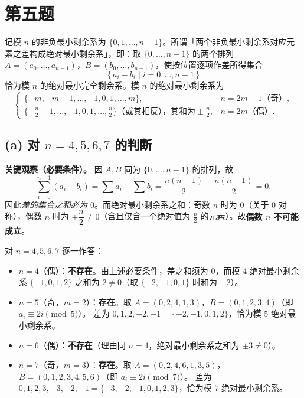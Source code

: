 \documentclass{article}
\begin{document}
\section{第五题}

记模 $n$ 的非负最小剩余系为 $\{0,1,\dots,n-1\}$。所谓「两个非负最小剩余系对应元素之差构成绝对最小剩余系」，即：取 $\{0,\dots,n-1\}$ 的两个排列 $A=(a_0,\dots,a_{n-1})$，$B=(b_0,\dots,b_{n-1})$，使按位置逐项作差所得集合
\[
  \{\,a_i-b_i\mid i=0,\dots,n-1\,\}
\]
恰为模 $n$ 的绝对最小完全剩余系。模 $n$ 的绝对最小剩余系为
\[
  \begin{cases}
    \{-m,-m+1,\dots,-1,0,1,\dots,m\}, & n=2m+1\text{（奇）},\\[2pt]
    \{-\tfrac n2+1,\dots,-1,0,1,\dots,\tfrac n2\}\text{（或其相反），其和为}\pm\tfrac n2, & n=2m\text{（偶）}.
  \end{cases}
\]

\subsection*{(a) 对 $n=4,5,6,7$ 的判断}

\begin{solution}
\textbf{关键观察（必要条件）。} 因 $A,B$ 同为 $\{0,\dots,n-1\}$ 的排列，故
\[
  \sum_{i=0}^{n-1}(a_i-b_i)=\sum a_i-\sum b_i=\frac{n(n-1)}2-\frac{n(n-1)}2=0.
\]
因此\emph{差的集合之和必为 $0$}。而绝对最小剩余系之和：奇数 $n$ 时为 $0$（关于 $0$ 对称），偶数 $n$ 时为 $\pm\dfrac n2\ne 0$（含且仅含一个绝对值为 $\frac n2$ 的元素）。故\textbf{偶数 $n$ 不可能成立}。

\medskip
对 $n=4,5,6,7$ 逐一作答：

\begin{itemize}
  \item $n=4$（偶）：\textbf{不存在}。由上述必要条件，差之和须为 $0$，而模 $4$ 绝对最小剩余系 $\{-1,0,1,2\}$ 之和为 $2\ne0$（取 $\{-2,-1,0,1\}$ 时和为 $-2$）。
  \item $n=5$（奇，$m=2$）：\textbf{存在}。取 $A=(0,2,4,1,3)$，$B=(0,1,2,3,4)$（即 $a_i\equiv 2i\pmod 5$）。
    差为 $0,1,2,-2,-1=\{-2,-1,0,1,2\}$，恰为模 $5$ 绝对最小剩余系。
  \item $n=6$（偶）：\textbf{不存在}（理由同 $n=4$，绝对最小剩余系之和为 $\pm 3\ne0$）。
  \item $n=7$（奇，$m=3$）：\textbf{存在}。取 $A=(0,2,4,6,1,3,5)$，$B=(0,1,2,3,4,5,6)$（即 $a_i\equiv 2i\pmod 7$）。
    差为 $0,1,2,3,-3,-2,-1=\{-3,-2,-1,0,1,2,3\}$，恰为模 $7$ 绝对最小剩余系。
\end{itemize}
\end{solution}
\end{document}
